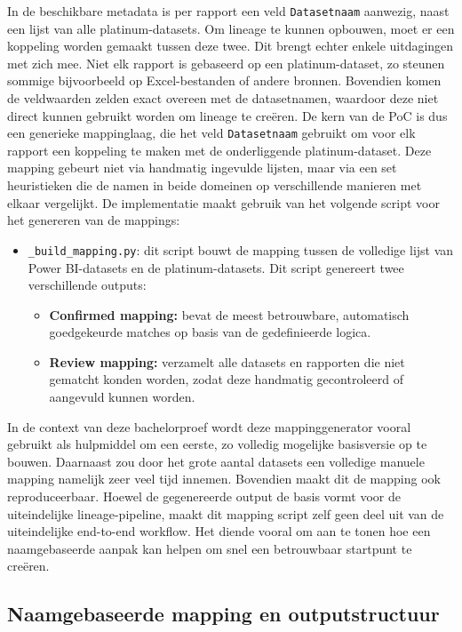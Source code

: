 In de beschikbare metadata is per rapport een veld \texttt{Datasetnaam} aanwezig, naast een lijst van alle platinum-datasets. Om lineage te kunnen opbouwen, moet er een koppeling worden gemaakt tussen deze twee. Dit brengt echter enkele uitdagingen met zich mee. Niet elk rapport is gebaseerd op een platinum-dataset, zo steunen sommige bijvoorbeeld op Excel-bestanden of andere bronnen. Bovendien komen de veldwaarden zelden exact overeen met de datasetnamen, waardoor deze niet direct kunnen gebruikt worden om lineage te creëren. De kern van de PoC is dus een generieke mappinglaag, die het veld \texttt{Datasetnaam} gebruikt om voor elk rapport een koppeling te maken met de onderliggende platinum-dataset. Deze mapping gebeurt niet via handmatig ingevulde lijsten, maar via een set heuristieken die de namen in beide domeinen op verschillende manieren met elkaar vergelijkt. De implementatie maakt gebruik van het volgende script voor het genereren van de mappings:
\begin{itemize}
	\item \texttt{\_build\_mapping.py}: dit script bouwt de mapping tussen de volledige lijst van Power BI-datasets en de platinum-datasets. Dit script genereert twee verschillende outputs:
	\begin{itemize}
		\item \textbf{Confirmed mapping:} bevat de meest betrouwbare, automatisch goedgekeurde matches op basis van de gedefinieerde logica.
		\item \textbf{Review mapping:} verzamelt alle datasets en rapporten die niet gematcht konden worden, zodat deze handmatig gecontroleerd of aangevuld kunnen worden.
	\end{itemize}
\end{itemize}

In de context van deze bachelorproef wordt deze mappinggenerator vooral gebruikt als hulpmiddel om een eerste, zo volledig mogelijke basisversie op te bouwen. Daarnaast zou door het grote aantal datasets een volledige manuele mapping namelijk zeer veel tijd innemen. Bovendien maakt dit de mapping ook reproduceerbaar. 
Hoewel de gegenereerde output de basis vormt voor de uiteindelijke lineage-pipeline, maakt dit mapping script zelf geen deel uit van de uiteindelijke end-to-end workflow. Het diende vooral om aan te tonen hoe een naamgebaseerde aanpak kan helpen om snel een betrouwbaar startpunt te creëren.\\

\subsection{Naamgebaseerde mapping en outputstructuur}

